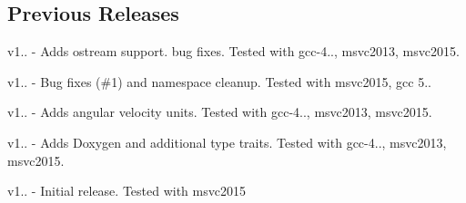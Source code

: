 \subsection*{Previous Releases }


\begin{DoxyItemize}
\item v1.. -\/ Adds ostream support. bug fixes. Tested with gcc-\/4.., msvc2013, msvc2015.
\item v1.. -\/ Bug fixes (\#1) and namespace cleanup. Tested with msvc2015, gcc 5..
\item v1.. -\/ Adds angular velocity units. Tested with gcc-\/4.., msvc2013, msvc2015.
\item v1.. -\/ Adds Doxygen and additional type traits. Tested with gcc-\/4.., msvc2013, msvc2015.
\item v1.. -\/ Initial release. Tested with msvc2015 
\end{DoxyItemize}